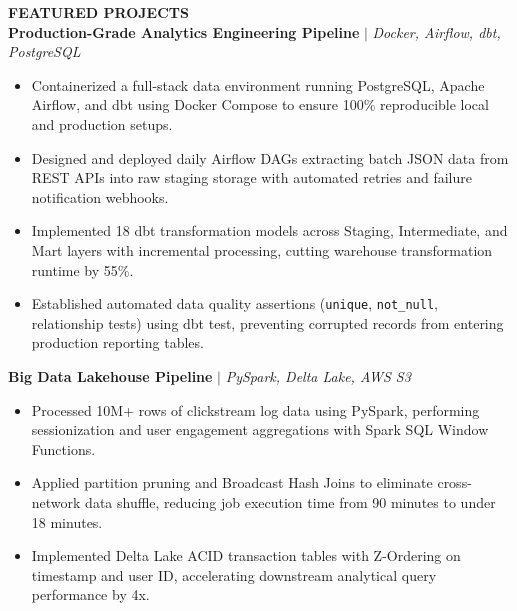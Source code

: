 \begin{samplecvbox}
\textbf{\large FEATURED PROJECTS}\\
\textbf{Production-Grade Analytics Engineering Pipeline} $|$ \textit{Docker, Airflow, dbt, PostgreSQL}
\begin{itemize}[leftmargin=12pt, nosep]
    \item Containerized a full-stack data environment running PostgreSQL, Apache Airflow, and dbt using Docker Compose to ensure 100\% reproducible local and production setups.
    \item Designed and deployed daily Airflow DAGs extracting batch JSON data from REST APIs into raw staging storage with automated retries and failure notification webhooks.
    \item Implemented 18 dbt transformation models across Staging, Intermediate, and Mart layers with incremental processing, cutting warehouse transformation runtime by 55\%.
    \item Established automated data quality assertions (\texttt{unique}, \texttt{not\_null}, relationship tests) using dbt test, preventing corrupted records from entering production reporting tables.
\end{itemize}\vspace{4pt}

\textbf{Big Data Lakehouse Pipeline} $|$ \textit{PySpark, Delta Lake, AWS S3}
\begin{itemize}[leftmargin=12pt, nosep]
    \item Processed 10M+ rows of clickstream log data using PySpark, performing sessionization and user engagement aggregations with Spark SQL Window Functions.
    \item Applied partition pruning and Broadcast Hash Joins to eliminate cross-network data shuffle, reducing job execution time from 90 minutes to under 18 minutes.
    \item Implemented Delta Lake ACID transaction tables with Z-Ordering on timestamp and user ID, accelerating downstream analytical query performance by 4x.
\end{itemize}
\end{samplecvbox}

